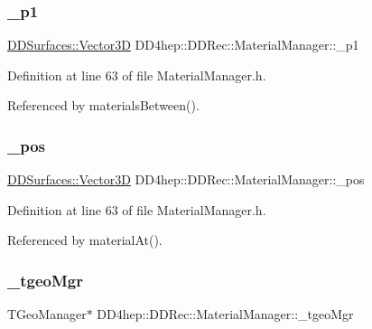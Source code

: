 \subsubsection{\texorpdfstring{\+\_\+p1}{\_p1}}
{\footnotesize\ttfamily \hyperlink{class_d_d_surfaces_1_1_vector3_d}{D\+D\+Surfaces\+::\+Vector3D} D\+D4hep\+::\+D\+D\+Rec\+::\+Material\+Manager\+::\+\_\+p1\hspace{0.3cm}{\ttfamily [protected]}}



Definition at line 63 of file Material\+Manager.\+h.



Referenced by materials\+Between().

\hypertarget{class_d_d4hep_1_1_d_d_rec_1_1_material_manager_a5ca78ff1887167e4173c1a4767835c6f}{}\label{class_d_d4hep_1_1_d_d_rec_1_1_material_manager_a5ca78ff1887167e4173c1a4767835c6f} 
\subsubsection{\texorpdfstring{\+\_\+pos}{\_pos}}
{\footnotesize\ttfamily \hyperlink{class_d_d_surfaces_1_1_vector3_d}{D\+D\+Surfaces\+::\+Vector3D} D\+D4hep\+::\+D\+D\+Rec\+::\+Material\+Manager\+::\+\_\+pos\hspace{0.3cm}{\ttfamily [protected]}}



Definition at line 63 of file Material\+Manager.\+h.



Referenced by material\+At().

\hypertarget{class_d_d4hep_1_1_d_d_rec_1_1_material_manager_aa5845dcf0e2d024c17250afa50f3bfb8}{}\label{class_d_d4hep_1_1_d_d_rec_1_1_material_manager_aa5845dcf0e2d024c17250afa50f3bfb8} 
\subsubsection{\texorpdfstring{\+\_\+tgeo\+Mgr}{\_tgeoMgr}}
{\footnotesize\ttfamily T\+Geo\+Manager$\ast$ D\+D4hep\+::\+D\+D\+Rec\+::\+Material\+Manager\+::\+\_\+tgeo\+Mgr\hspace{0.3cm}{\ttfamily [protected]}}




